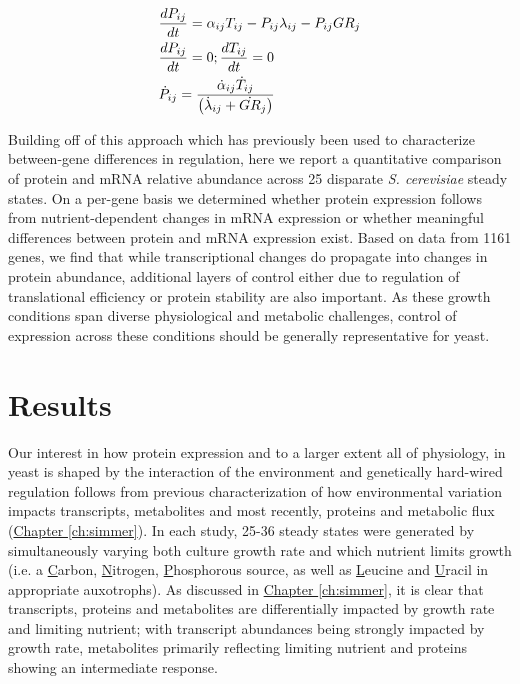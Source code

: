 \begin{align}
&\frac{dP_{ij}}{dt} = \alpha_{ij}T_{ij} - P_{ij}\lambda_{ij} - P_{ij}GR_{j}\notag\\
&\frac{dP_{ij}}{dt} = 0 ; \frac{dT_{ij}}{dt} = 0 \notag\\
&\dot{P}_{ij} = \frac{\dot{\alpha}_{ij}\dot{T}_{ij}}{\left(\dot{\lambda}_{ij} + \dot{GR}_{j}\right)}\label{steady_expression}
\end{align}


Building off of this approach which has previously been used to characterize between-gene differences in regulation, here we report a quantitative comparison of protein and mRNA relative abundance across 25 disparate \textit{S. cerevisiae} steady states.  On a per-gene basis we determined whether protein expression follows from nutrient-dependent changes in mRNA expression or whether meaningful differences between protein and mRNA expression exist.  Based on data from 1161 genes, we find that while transcriptional changes do propagate into changes in protein abundance, additional layers of control either due to regulation of translational efficiency or protein stability are also important. As these growth conditions span diverse physiological and metabolic challenges, control of expression across these conditions should be generally representative for yeast.

\section{Results}

Our interest in how protein expression and to a larger extent all of physiology, in yeast is shaped by the interaction of the environment and genetically hard-wired regulation follows from previous characterization of how environmental variation impacts transcripts, metabolites \cite{Brauer:2008jn, Boer:2010fb} and most recently, proteins and metabolic flux (\hyperref[ch:simmer]{Chapter \ref{ch:simmer}}). In each study, 25-36 steady states were generated by simultaneously varying both culture growth rate and which nutrient limits growth (i.e. a \underline{C}arbon, \underline{N}itrogen, \underline{P}hosphorous source, as well as \underline{L}eucine and \underline{U}racil in appropriate auxotrophs). As discussed in \hyperref[ch:simmer]{Chapter \ref{ch:simmer}}, it is clear that transcripts, proteins and metabolites are differentially impacted by growth rate and limiting nutrient; with transcript abundances being strongly impacted by growth rate, metabolites primarily reflecting limiting nutrient and proteins showing an intermediate response.

